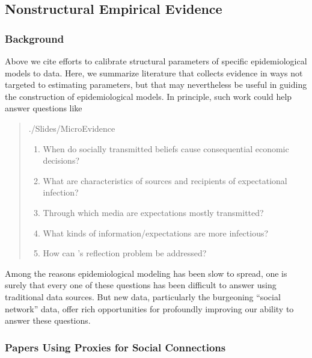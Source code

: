 \subsection{Nonstructural Empirical Evidence}\label{subsec:microEvidence}


\subsubsection{Background}

Above we cite efforts to calibrate structural parameters of specific epidemiological models to data.  %
Here, we summarize literature that collects evidence in ways not targeted to estimating parameters, but that may nevertheless be useful in guiding the construction of epidemiological models.  In principle, such work could help answer questions like
\begin{quote}
    \normalfont
    \begin{verbatimwrite}{./Slides/MicroEvidence}
\begin{enumerate}
	\item When do socially transmitted beliefs cause consequential economic decisions?
    \item What are characteristics of sources and recipients of expectational infection?
    \item Through which media are expectations mostly transmitted?
    \item What kinds of information/expectations are more infectious?
    \item How can \cite{manski1993identification}'s reflection problem be addressed?
    \end{enumerate}
\end{verbatimwrite}

\end{quote}

Among the reasons epidemiological modeling has been slow to spread, one is surely that every one of these questions has been difficult to answer using traditional data sources.  But new data, particularly the burgeoning ``social network'' data, offer rich opportunities for profoundly improving our ability to answer these questions.

\subsubsection{Papers Using Proxies for Social Connections}

